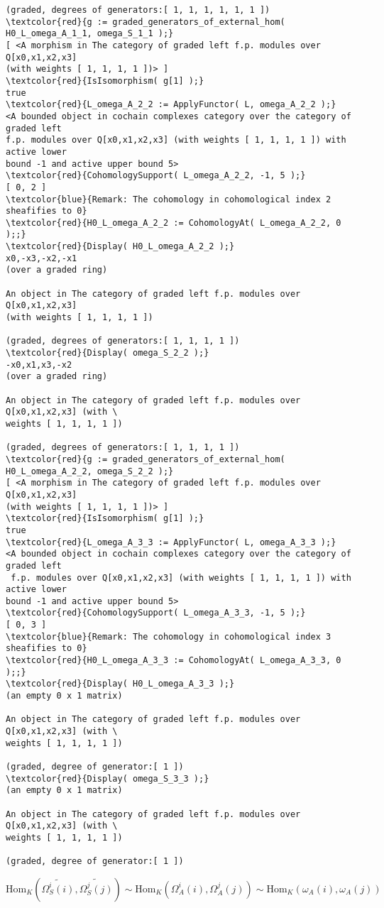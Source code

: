 \documentclass[16pt,a4paper]{extarticle}
\theoremstyle{definition}
\begin{document}
\begin{Verbatim}[commandchars=\\\{\}]
(graded, degrees of generators:[ 1, 1, 1, 1, 1, 1 ])
\textcolor{red}{g := graded_generators_of_external_hom( H0_L_omega_A_1_1, omega_S_1_1 );}
[ <A morphism in The category of graded left f.p. modules over Q[x0,x1,x2,x3] 
(with weights [ 1, 1, 1, 1 ])> ]
\textcolor{red}{IsIsomorphism( g[1] );}
true
\textcolor{red}{L_omega_A_2_2 := ApplyFunctor( L, omega_A_2_2 );}
<A bounded object in cochain complexes category over the category of graded left
f.p. modules over Q[x0,x1,x2,x3] (with weights [ 1, 1, 1, 1 ]) with active lower
bound -1 and active upper bound 5>
\textcolor{red}{CohomologySupport( L_omega_A_2_2, -1, 5 );}
[ 0, 2 ]
\textcolor{blue}{Remark: The cohomology in cohomological index 2 sheafifies to 0}
\textcolor{red}{H0_L_omega_A_2_2 := CohomologyAt( L_omega_A_2_2, 0 );;}
\textcolor{red}{Display( H0_L_omega_A_2_2 );}
x0,-x3,-x2,-x1
(over a graded ring)

An object in The category of graded left f.p. modules over Q[x0,x1,x2,x3] 
(with weights [ 1, 1, 1, 1 ])

(graded, degrees of generators:[ 1, 1, 1, 1 ])
\textcolor{red}{Display( omega_S_2_2 );}
-x0,x1,x3,-x2
(over a graded ring)

An object in The category of graded left f.p. modules over Q[x0,x1,x2,x3] (with \
weights [ 1, 1, 1, 1 ])

(graded, degrees of generators:[ 1, 1, 1, 1 ])
\textcolor{red}{g := graded_generators_of_external_hom( H0_L_omega_A_2_2, omega_S_2_2 );}
[ <A morphism in The category of graded left f.p. modules over Q[x0,x1,x2,x3] 
(with weights [ 1, 1, 1, 1 ])> ]
\textcolor{red}{IsIsomorphism( g[1] );}
true
\textcolor{red}{L_omega_A_3_3 := ApplyFunctor( L, omega_A_3_3 );}
<A bounded object in cochain complexes category over the category of graded left
 f.p. modules over Q[x0,x1,x2,x3] (with weights [ 1, 1, 1, 1 ]) with active lower
bound -1 and active upper bound 5>
\textcolor{red}{CohomologySupport( L_omega_A_3_3, -1, 5 );}
[ 0, 3 ]
\textcolor{blue}{Remark: The cohomology in cohomological index 3 sheafifies to 0}
\textcolor{red}{H0_L_omega_A_3_3 := CohomologyAt( L_omega_A_3_3, 0 );;}
\textcolor{red}{Display( H0_L_omega_A_3_3 );}
(an empty 0 x 1 matrix)

An object in The category of graded left f.p. modules over Q[x0,x1,x2,x3] (with \
weights [ 1, 1, 1, 1 ])

(graded, degree of generator:[ 1 ])
\textcolor{red}{Display( omega_S_3_3 );}
(an empty 0 x 1 matrix)

An object in The category of graded left f.p. modules over Q[x0,x1,x2,x3] (with \
weights [ 1, 1, 1, 1 ])

(graded, degree of generator:[ 1 ])
\end{Verbatim}
$$\mathrm{Hom}_K(\widetilde{\Omega^i_S(i)}, \widetilde{\Omega^j_S(j)}) \sim 
\mathrm{Hom}_K(\Omega^i_A(i), \Omega^j_A(j)) \sim \mathrm{Hom}_K(\omega_A(i), \omega_A(j))$$
\end{document}
